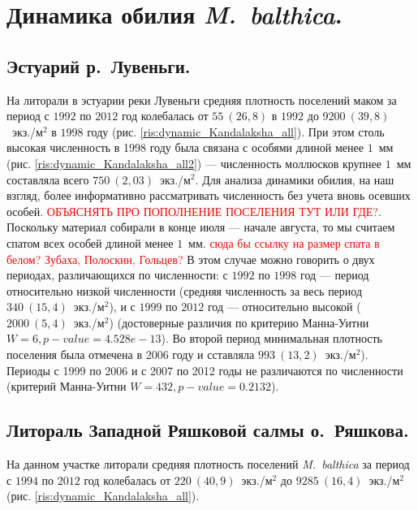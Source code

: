 \documentclass[12pt, a4paper]{article}
\begin{document}
\section{Динамика обилия {\it M.~balthica}.}
\subsection{Эстуарий р.~Лувеньги.}

На литорали в эстуарии реки Лувеньги средняя плотность поселений маком за период с $1992$ по $2012$ год колебалась от $55~(26,8)$ в $1992$ до $9200~(39,8)$~экз./м$^2$ в $1998$ году (рис. \ref{ris:dynamic_Kandalaksha_all}). 
При этом столь высокая численность в 1998 году была связана с особями длиной менее $1$~мм (рис. \ref{ris:dynamic_Kandalaksha_all2}) --- численность моллюсков крупнее $1$~мм составляла всего $750~(2,03)$~экз./м$^2$.
Для анализа динамики обилия, на наш взгляд, более информативно рассматривать численность без учета вновь осевших особей. 
\textcolor{red}{ОБЪЯСНЯТЬ ПРО ПОПОЛНЕНИЕ ПОСЕЛЕНИЯ ТУТ ИЛИ ГДЕ?}. 
Поскольку материал собирали в конце июля --- начале августа, то мы считаем спатом всех особей длиной менее $1$~мм. \textcolor{red}{сюда бы ссылку на размер спата в белом? Зубаха, Полоскин, Гольцев?} 
В этом случае можно говорить о двух периодах, различающихся по численности: с $1992$ по $1998$ год --- период относительно низкой численности (средняя численность за весь период $340~(15,4)$~экз./м$^2$), и с $1999$ по $2012$ год --- относительно высокой ($2000~(5,4)$~экз./м$^2$) (достоверные различия по критерию Манна-Уитни $W = 6, p-value = 4.528e-13$).
Во второй период минимальная плотность поселения была отмечена в 2006 году и сставляла $993~(13,2)$~экз./м$^2$). 
Периоды с 1999 по 2006 и с 2007 по 2012 годы не различаются по численности (критерий Манна-Уитни $W = 432, p-value = 0.2132$).


\subsection{Литораль Западной Ряшковой салмы о.~Ряшкова.}
На данном участке литорали средняя плотность поселений {\it M.~balthica} за период с $1994$ по $2012$ год колебалась от $220~(40,9)$~экз./м$^2$ до $9285~(16,4)$~экз./м$^2$ (рис. \ref{ris:dynamic_Kandalaksha_all}).
\end{document}
